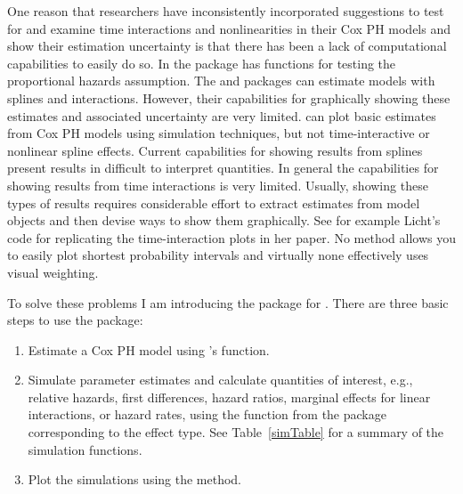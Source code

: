 \documentclass[nojss]{jss}\usepackage[]{graphicx}\usepackage[]{color}
\begin{document}
One reason that researchers have inconsistently incorporated suggestions to test for and examine time interactions and nonlinearities in their Cox PH models and show their estimation uncertainty is that there has been a lack of computational capabilities to easily do so. In  the  \citep{R-survival} package has functions for testing the proportional hazards assumption. The  and  \citep{R-zelig} packages can estimate models with splines and interactions. However, their capabilities for graphically showing these estimates and associated uncertainty are very limited.  can plot basic estimates from Cox PH models using simulation techniques, but not time-interactive or nonlinear spline effects. Current capabilities for showing results from splines present results in difficult to interpret quantities. In general the capabilities for showing results from time interactions is very limited. Usually, showing these types of results requires considerable effort to extract estimates from model objects and then devise ways to show them graphically. See for example Licht's \citeyearpar{Licht2011data}  \citep{StataCite} code for replicating the time-interaction plots in her paper. No method allows you to easily plot shortest probability intervals and virtually none effectively uses visual weighting.

To solve these problems I am introducing the  package for . There are three basic steps to use the package:

\begin{enumerate}
    \item Estimate a Cox PH model using 's  function.
    \item Simulate parameter estimates and calculate quantities of interest, e.g., relative hazards, first differences, hazard ratios, marginal effects for linear interactions, or hazard rates, using the function from the   package corresponding to the effect type. See Table~\ref{simTable} for a summary of the simulation functions.
    \item Plot the simulations using the  method.
\end{enumerate}
\end{document}

